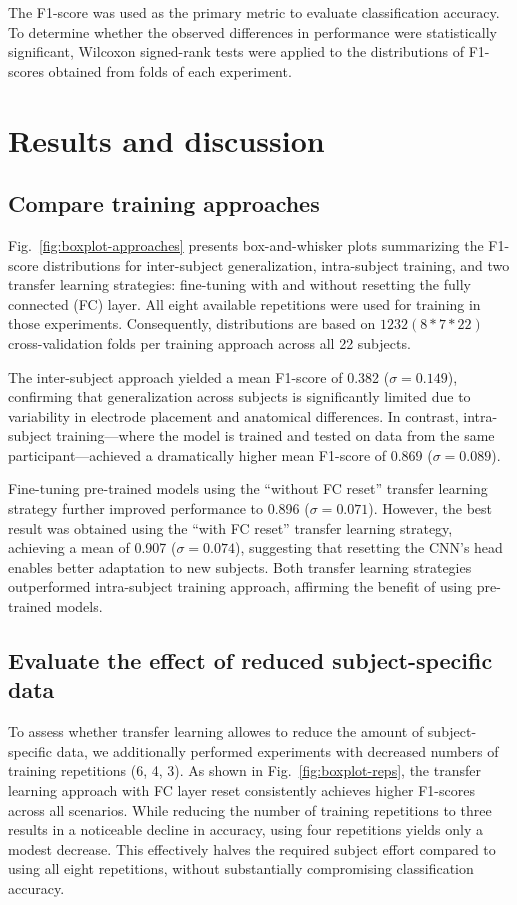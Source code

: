 \begin{multicols}{2}
The F1-score was used as the primary metric to evaluate classification accuracy. To determine whether the observed differences in performance were statistically significant, Wilcoxon signed-rank tests were applied to the distributions of F1-scores obtained from folds of each experiment.

\section{Results and discussion}


\subsection*{Compare training approaches}

Fig.~\ref{fig:boxplot-approaches} presents box-and-whisker plots summarizing the F1-score distributions for inter-subject generalization, intra-subject training, and two transfer learning strategies: fine-tuning with and without resetting the fully connected (FC) layer. All eight available repetitions were used for training in those experiments. Consequently, distributions are based on $1232 (8*7*22)$ cross-validation folds per training approach across all 22 subjects.

The inter-subject approach yielded a mean F1-score of 0.382 ($\sigma = 0.149$), confirming that generalization across subjects is significantly limited due to variability in electrode placement and anatomical differences. In contrast, intra-subject training—where the model is trained and tested on data from the same participant—achieved a dramatically higher mean F1-score of 0.869 ($\sigma = 0.089$).

Fine-tuning pre-trained models using the ``without FC reset'' transfer learning strategy further improved performance to 0.896 ($\sigma = 0.071$). However, the best result was obtained using the ``with FC reset'' transfer learning strategy, achieving a mean of 0.907 ($\sigma = 0.074$), suggesting that resetting the CNN's head enables better adaptation to new subjects. Both transfer learning strategies outperformed intra-subject training approach, affirming the benefit of using pre-trained models.

\subsection*{Evaluate the effect of reduced subject-specific data}

To assess whether transfer learning allowes to reduce the amount of subject-specific data, we additionally performed experiments with decreased numbers of training repetitions (6, 4, 3). As shown in Fig.~\ref{fig:boxplot-reps}, the transfer learning approach with FC layer reset consistently achieves higher F1-scores across all scenarios. While reducing the number of training repetitions to three results in a noticeable decline in accuracy, using four repetitions yields only a modest decrease. This effectively halves the required subject effort compared to using all eight repetitions, without substantially compromising classification accuracy.

\end{multicols}

